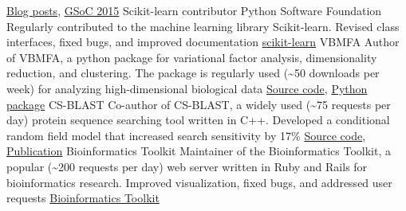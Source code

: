 \documentclass[11pt,a4paper]{moderncv}
\newcommand\chref[3][magenta]{\href{#2}{\small\color{#1}#3}}
\begin{document}
         {\chref{https://cangermueller.com/blog/}{Blog posts},
          \chref{http://www.google-melange.com/gsoc/homepage/google/gsoc2015}{GSoC 2015}}
         {Scikit-learn contributor}
         {\hfill\break Python Software Foundation}
         {}
         {\hfill\break Regularly contributed to the machine learning library Scikit-learn. Revised class interfaces, fixed bugs, and improved documentation}
         {\chref{https://github.com/scikit-learn/scikit-learn}{scikit-learn}}
         {VBMFA}
         {}
         {}
         {\hfill\break Author of VBMFA, a python package for variational factor analysis, dimensionality reduction, and clustering. The package is regularly used (\textasciitilde50 downloads per week) for analyzing high-dimensional biological data}
         {\chref{https://github.com/cangermueller/vbmfa}{Source code},
          \chref{http://pythonhosted.org/vbmfa/}{Python package}}
         {CS-BLAST}
         {}
         {}
         {\hfill\break Co-author of CS-BLAST, a widely used (\textasciitilde75 requests per day) protein sequence searching tool written in C++. Developed a conditional random field model that increased search sensitivity by 17\%}
         {\chref{https://github.com/cangermueller/csblast}{Source code},
          \chref{http://bioinformatics.oxfordjournals.org/content/28/24/3240.short}{Publication}}
         {Bioinformatics Toolkit}
         {}
         {}
         {\hfill\break Maintainer of the Bioinformatics Toolkit, a popular (\textasciitilde200 requests per day) web server written in Ruby and Rails for bioinformatics research. Improved visualization, fixed bugs, and addressed user requests}
         {\chref{http://toolkit.tuebingen.mpg.de}{Bioinformatics Toolkit}}
\end{document}
